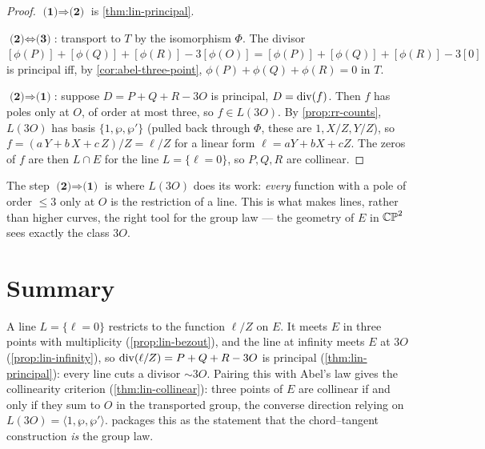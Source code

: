 \begin{proof}
\(\textbf{(1)} \Rightarrow \textbf{(2)}\) is \cref{thm:lin-principal}.

\(\textbf{(2)} \Leftrightarrow \textbf{(3)}\): transport to \(T\) by the
isomorphism \(\Phi\). The divisor \([\phi(P)] + [\phi(Q)] + [\phi(R)] - 3[\phi(O)]
= [\phi(P)]+[\phi(Q)]+[\phi(R)] - 3[0]\) is principal iff, by
\cref{cor:abel-three-point}, \(\phi(P) + \phi(Q) + \phi(R) = 0\) in \(T\).

\(\textbf{(2)} \Rightarrow \textbf{(1)}\): suppose \(D = P + Q + R - 3O\) is
principal, \(D = \operatorname{div}(f)\). Then \(f\) has poles only at \(O\), of order at
most three, so \(f \in L(3O)\). By \cref{prop:rr-counts}, \(L(3O)\) has basis
\(\{1, \wp, \wp'\}\) (pulled back through \(\Phi\), these are
\(1, X/Z, Y/Z\)), so \(f = (a\,Y + b\,X + c\,Z)/Z = \ell/Z\) for a linear form
\(\ell = aY + bX + cZ\). The zeros of \(f\) are then \(L \cap E\) for the line
\(L = \{\ell = 0\}\), so \(P, Q, R\) are collinear.
\end{proof}

\begin{remark}
\label{rem:lin-converse}
The step \(\textbf{(2)} \Rightarrow \textbf{(1)}\) is where \(L(3O)\) does its
work: \emph{every} function with a pole of order \(\le 3\) only at \(O\) is the
restriction of a line. This is what makes lines, rather than higher curves, the
right tool for the group law --- the geometry of \(E\) in \(\mathbb{CP}^2\) sees exactly the
class \(3O\).
\end{remark}

\section{Summary}
\label{sec:lin-summary}

A line \(L = \{\ell = 0\}\) restricts to the function \(\ell/Z\) on \(E\). It meets
\(E\) in three points with multiplicity (\cref{prop:lin-bezout}), and the line at
infinity meets \(E\) at \(3O\) (\cref{prop:lin-infinity}), so
\(\operatorname{div}(\ell/Z) = P + Q + R - 3O\) is principal (\cref{thm:lin-principal}):
every line cuts a divisor \(\sim 3O\). Pairing this with Abel's law gives the
collinearity criterion (\cref{thm:lin-collinear}): three points of \(E\) are
collinear if and only if they sum to \(O\) in the transported group, the converse
direction relying on \(L(3O) = \langle 1, \wp, \wp'\rangle\). 
packages this as the statement that the chord--tangent construction \emph{is} the
group law.

